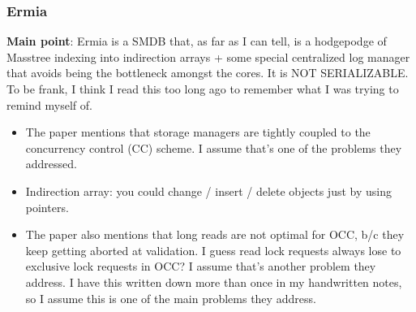 \subsubsection{Ermia}
\textbf{Main point}: Ermia \cite{ermia} is a SMDB that, as far as I can tell, is a hodgepodge of Masstree indexing into indirection arrays + some special centralized log manager that avoids being the bottleneck amongst the cores. It is NOT SERIALIZABLE. To be frank, I think I read this too long ago to remember what I was trying to remind myself of.
\begin{itemize}
    \item The paper mentions that storage managers are tightly coupled to the concurrency control (CC) scheme. I assume that's one of the problems they addressed.
    \item Indirection array: you could change / insert / delete objects just by using pointers.
    \item The paper also mentions that long reads are not optimal for OCC, b/c they keep getting aborted at validation. I guess read lock requests always lose to exclusive lock requests in OCC? I assume that's another problem they address. I have this written down more than once in my handwritten notes, so I assume this is one of the main problems they address.
\end{itemize}

